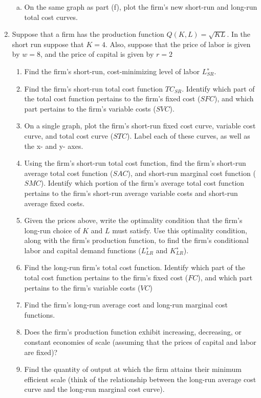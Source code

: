 \documentclass[11pt]{article}
\begin{document}
\begin{enumerate}
\begin{enumerate}[(a)]
    \item On the same graph as part (f), plot the firm’s new short-run and long-run total cost curves.
  \end{enumerate}
  
  \newpage
  \item Suppose that a firm has the production function $Q(K, L) = \sqrt{KL}$. In the short run suppose that $K = 4$. Also, suppose that the price of labor is given by $w = 8$, and the price of capital is given by $r = 2$
  
  \begin{enumerate}
  
    \item Find the firm’s short-run, cost-minimizing level of labor $L^∗_{SR}$.
  
  \item Find the firm’s short-run total cost function $TC_{SR}$. Identify which part of the total cost function pertains to the firm’s fixed cost ($SFC$), and which part pertains to the firm’s variable costs ($SVC$).
  
  \item On a single graph, plot the firm’s short-run fixed cost curve, variable cost curve, and total cost curve ($STC$). Label each of these curves, as well as the x- and y- axes.
  
  \item Using the firm’s short-run total cost function, find the firm’s short-run average total cost function ($SAC$), and short-run marginal cost function ($SMC$). Identify which portion of the firm’s average total cost function pertains to the firm’s short-run average variable costs and short-run average fixed costs.
  
  \item Given the prices above, write the optimality condition that the firm’s long-run choice of $K$ and $L$ must satisfy. Use this optimality condition, along with the firm’s production function, to find the firm’s conditional labor and capital demand functions ($L^∗_{LR}$ and $K^∗_{LR}$).
  
  \item Find the long-run firm’s total cost function. Identify which part of the total cost function pertains to the firm’s fixed cost ($FC$), and which part pertains to the firm’s variable costs ($VC$)
  
  \item Find the firm’s long-run average cost and long-run marginal cost functions.
  
  \item Does the firm’s production function exhibit increasing, decreasing, or constant economies of scale (assuming that the prices of capital and labor are fixed)?
  
  \item Find the quantity of output at which the firm attains their minimum efficient scale (think of the relationship between the long-run average cost curve and the long-run marginal cost curve).
  \end{enumerate}
\end{enumerate}
\end{document}

